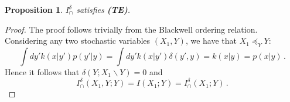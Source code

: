 \documentclass{article}
\newcommand{\TE}{\textbf{(TE)}\xspace} %
\newcommand{\Idelta}{\ensuremath{I_\cap^{\delta}}\xspace}
\newtheorem{proposition}{Proposition}
\begin{document}
\begin{proposition} \label{prop:Delta-TE}
    $\Idelta$ satisfies \TE.
\end{proposition}
\begin{proof}
    The proof follows trivially from the Blackwell ordering relation. Considering any two stochastic variables $(X_1,Y)$, we have that $X_1\preceq_Y Y$:
    \begin{equation}
        \int dy' k(x|y')p(y'|y) = \int dy' k(x|y')\delta(y',y) = k(x|y) = p(x|y) \,.
    \end{equation}
    Hence it follows that $\delta(Y;X_1\backslash Y)=0$ and 
    \begin{equation}
        \Idelta(X_1,Y;Y) = I(X_1;Y) = \Idelta(X_1;Y) \,.
    \end{equation}
\end{proof}
\end{document}
